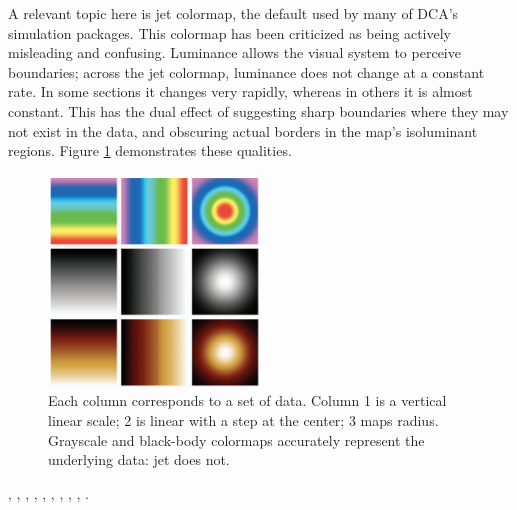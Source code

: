 \documentclass[11pt,a4paper,article]{memoir} %
\begin{document}
A relevant topic here is jet colormap, the default used by many of DCA's simulation packages. This colormap has been criticized as being actively misleading and confusing. Luminance allows the visual system to perceive boundaries; across the jet colormap, luminance does not change at a constant rate. In some sections it changes very rapidly, whereas in others it is almost constant. This has the dual effect of suggesting sharp boundaries where they may not exist in the data, and obscuring actual borders in the map's isoluminant regions. Figure \ref{fig:jet} demonstrates these qualities.
\begin{figure}
\centering
\includegraphics[width=0.5\textwidth]{jet.png}
\caption{\small{Each column corresponds to a set of data. Column 1 is a vertical linear scale; 2 is linear with a step at the center; 3 maps radius. Grayscale and black-body colormaps accurately represent the underlying data: jet does not.}}
\label{fig:jet}
\end{figure}

\cite{hastie2013elements}, \cite{gelman2013bayesian}, \cite{faraway2004linear}, \cite{blitzstein2014introduction}, \cite{jaynes2003probability}, \cite{wickham2009ggplot2}, \cite{montgomery2000design}, \cite{kruschke2015doing}, \cite{iso2014statistical}, \cite{borland2007rainbow}.


\end{document}
